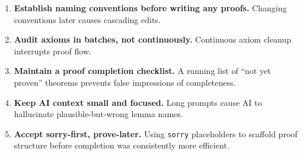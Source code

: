 \begin{enumerate}
  \item \textbf{Establish naming conventions before writing any proofs.} Changing
        conventions later causes cascading edits.
  \item \textbf{Audit axioms in batches, not continuously.} Continuous axiom
        cleanup interrupts proof flow.
  \item \textbf{Maintain a proof completion checklist.} A running list of ``not
        yet proven'' theorems prevents false impressions of completeness.
  \item \textbf{Keep AI context small and focused.} Long prompts cause AI to
        hallucinate plausible-but-wrong lemma names.
  \item \textbf{Accept sorry-first, prove-later.} Using \texttt{sorry}
        placeholders to scaffold proof structure before completion was
        consistently more efficient.
\end{enumerate}
